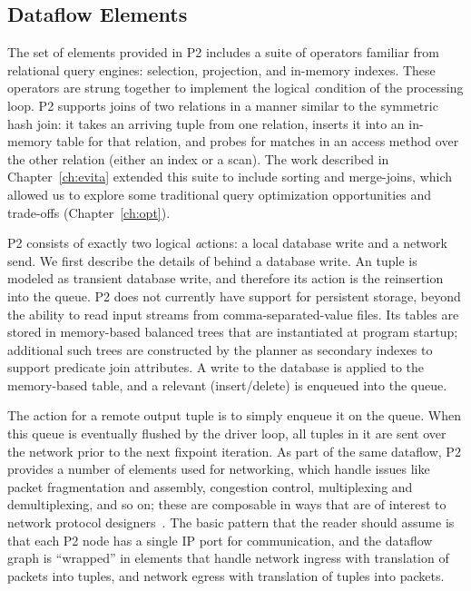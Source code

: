 \subsection{Dataflow Elements} 
\label{ch:p2:sec:dataflow_elements}

The set of elements provided in P2 includes a suite of operators familiar from
relational query engines: selection, projection, and in-memory indexes.  These
operators are strung together to implement the logical {\emph condition} of the 
processing loop.  P2 supports joins of two relations in a manner similar to the
symmetric hash join: it takes an arriving tuple from one relation, inserts it
into an in-memory table for that relation, and probes for matches in an access
method over the other relation (either an index or a scan).  The work described
in Chapter~\ref{ch:evita} extended this suite to include sorting and
merge-joins, which allowed us to explore some traditional query optimization
opportunities and trade-offs (Chapter~\ref{ch:opt}).

P2 consists of exactly two logical {\emph actions}: a local database write and
a network send.  We first describe the details of behind a database write.  An
 tuple is modeled as transient database write, and therefore its
action is the reinsertion into the  queue.  P2 does not currently
have support for persistent storage, beyond the ability to read input streams
from comma-separated-value files.  Its tables are stored in memory-based
balanced trees that are instantiated at program startup; additional such trees
are constructed by the planner as secondary indexes to support predicate join
attributes.  A write to the database is applied to the memory-based table, and
a relevant (insert/delete)  is enqueued into the  queue.

The action for a remote output tuple is to simply enqueue it on the 
queue.  When this queue is eventually flushed by the driver loop, all tuples in
it are sent over the network prior to the next fixpoint iteration.  As part of
the same dataflow, P2 provides a number of elements used for networking, which
handle issues like packet fragmentation and assembly, congestion control,
multiplexing and demultiplexing, and so on; these are composable in ways that
are of interest to network protocol designers~\cite{condie-hotnets05}.  The
basic pattern that the reader should assume is that each P2 node has a single
IP port for communication, and the dataflow graph is ``wrapped'' in elements
that handle network ingress with translation of packets into tuples, and
network egress with translation of tuples into packets.

